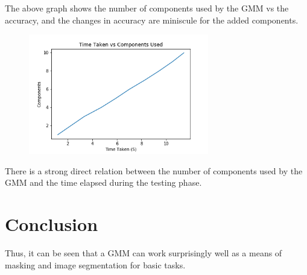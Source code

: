 \documentclass[10pt]{article}
\begin{document}
The above graph shows the number of components used by the GMM vs the accuracy, and the changes in accuracy are miniscule for the added components. 

\begin{figure}[H]
    \includegraphics[width=0.7\textwidth]{Timetaken}
    \centering
\end{figure}


There is a strong direct relation between the number of components used by the GMM and the time elapsed during the testing phase.

\section{Conclusion}
Thus, it can be seen that a GMM can work surprisingly well as a means of masking and image segmentation for basic tasks.



\end{document}
